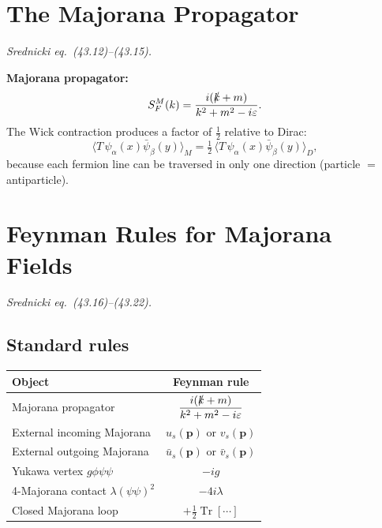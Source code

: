 \documentclass[12pt]{article}
\DeclareMathOperator\Tr{Tr}
\begin{document}
\section{The Majorana Propagator}

\textit{Srednicki eq.\ (43.12)--(43.15).}

\begin{mdframed}[backgroundcolor=blue!5]
\textbf{Majorana propagator:}
\begin{equation}\label{eq:majorana-prop}
  S_F^M(k) = \frac{i(\slashed{k}+m)}{k^2+m^2-i\varepsilon}.
\end{equation}
The Wick contraction produces a factor of $\tfrac{1}{2}$ relative to Dirac:
\begin{equation}
  \langle T\,\psi_\alpha(x)\bar\psi_\beta(y)\rangle_M
  = \tfrac{1}{2}\,\langle T\,\psi_\alpha(x)\bar\psi_\beta(y)\rangle_D,
\end{equation}
because each fermion line can be traversed in only one direction (particle $=$ antiparticle).
\end{mdframed}

\section{Feynman Rules for Majorana Fields}

\textit{Srednicki eq.\ (43.16)--(43.22).}

\subsection{Standard rules}

\begin{center}
\begin{tabular}{lc}
\toprule
Object & Feynman rule \\
\midrule
Majorana propagator & $\displaystyle\frac{i(\slashed{k}+m)}{k^2+m^2-i\varepsilon}$ \\[8pt]
External incoming Majorana & $u_s(\mathbf{p})$ or $v_s(\mathbf{p})$ \\
External outgoing Majorana & $\bar u_s(\mathbf{p})$ or $\bar v_s(\mathbf{p})$ \\
Yukawa vertex $g\phi\psi\psi$ & $-ig$ \\
4-Majorana contact $\lambda(\psi\psi)^2$ & $-4i\lambda$ \\
Closed Majorana loop & $+\tfrac{1}{2}\Tr[\cdots]$ \\
\bottomrule
\end{tabular}
\end{center}
\end{document}

